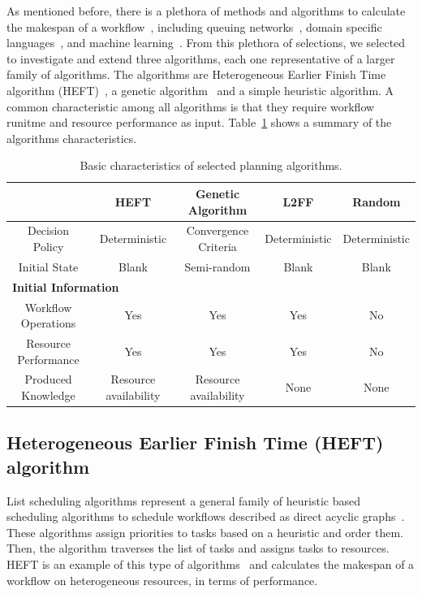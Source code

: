 As mentioned before, there is a plethora of methods and algorithms to calculate the makespan of a workflow~\cite{lu2019review}, including queuing networks~\cite{yao2019throughput,bao2019performance}, domain specific languages~\cite{carothers2017durango,maheshwari2016workflow}, and machine learning~\cite{witt2019predictive,pumma2017runtime}.
From this plethora of selections, we selected to investigate and extend three algorithms, each one representative of a larger family of algorithms.
The algorithms are Heterogeneous Earlier Finish Time algorithm (HEFT)~\cite{topcuoglu2002performance}, a genetic algorithm~\cite{page2005algorithm} and a simple heuristic algorithm.
A common characteristic among all algorithms is that they require workflow runitme and resource performance as input.
Table~\ref{tab:sched_algo} shows a summary of the algorithms characteristics.

\begin{table}[t]
    \centering
    \scriptsize
    \begin{tabular}{@{}ccccc@{}}
        \toprule
        &\textbf{HEFT}     &\textbf{Genetic Algorithm} &\textbf{L2FF} & \textbf{Random} \\
        \midrule
        Decision Policy   &Deterministic &Convergence Criteria &Deterministic& Deterministic\\
        Initial State    &Blank &Semi-random &Blank & Blank\\
        \midrule
        \multicolumn{5}{l}{\textbf{Initial Information}}\\\midrule
        Workflow Operations &Yes & Yes & Yes & No\\
        Resource Performance &Yes &Yes &Yes & No\\
        \midrule
        Produced Knowledge& Resource availability& Resource availability&None&None\\
        \bottomrule
    \end{tabular}
    \caption{Basic characteristics of selected planning algorithms.\label{tab:sched_algo}}
\end{table}

\subsection{Heterogeneous Earlier Finish Time (HEFT) algorithm}
\label{algo:heft}
List scheduling algorithms represent a general family of heuristic based scheduling algorithms to schedule workflows described as direct acyclic graphs~\cite{dong2006scheduling,list_sched_wiki}. 
These algorithms assign priorities to tasks based on a heuristic and order them.
Then, the algorithm traverses the list of tasks and assigns tasks to resources.
HEFT is an example of this type of algorithms~\cite{dong2006scheduling} and calculates the makespan of a workflow on heterogeneous resources, in terms of performance.

